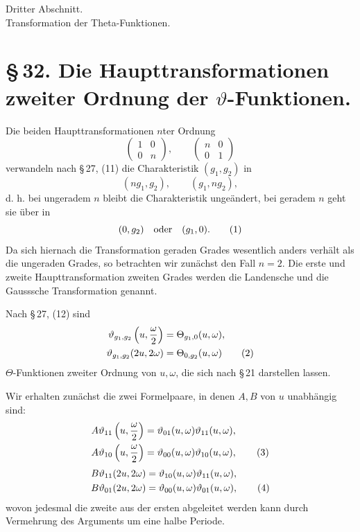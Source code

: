 \documentclass[11pt]{article}
\providecommand{\tht}{\vartheta}
\begin{document}
\begin{center}
{\large Dritter Abschnitt.}\\[0.7em]
{\Large Transformation der Theta-Funktionen.}
\end{center}

\section*{\S\,32. Die Haupttransformationen zweiter Ordnung der $\vartheta$-Funktionen.}

Die beiden Haupttransformationen $n$ter Ordnung
\[
\begin{pmatrix}1&0\\0&n\end{pmatrix},
\qquad
\begin{pmatrix}n&0\\0&1\end{pmatrix}
\]
verwandeln nach \S\,27, (11) die Charakteristik $(g_1,g_2)$ in
\[
(ng_1,g_2),\qquad (g_1,ng_2),
\]
d. h. bei ungeradem $n$ bleibt die Charakteristik ungeändert, bei geradem $n$ geht sie über in
\begin{equation}
(0,g_2)\quad\hbox{oder}\quad(g_1,0). \tag{1}
\end{equation}
Da sich hiernach die Transformation geraden Grades wesentlich anders verhält als die ungeraden Grades, so betrachten wir zunächst den Fall $n=2$. Die erste und zweite Haupttransformation zweiten Grades werden die Landensche und die Gausssche Transformation genannt.

Nach \S\,27, (12) sind
\begin{align}
\tht_{g_1,g_2}\left(u,{\omega\over2}\right)&=\Theta_{g_1,0}(u,\omega),\notag\\
\tht_{g_1,g_2}(2u,2\omega)&=\Theta_{0,g_2}(u,\omega) \tag{2}
\end{align}
$\Theta$-Funktionen zweiter Ordnung von $u,\omega$, die sich nach \S\,21 darstellen lassen.

Wir erhalten zunächst die zwei Formelpaare, in denen $A,B$ von $u$ unabhängig sind:
\begin{align}
A\tht_{11}\left(u,{\omega\over2}\right)&=\tht_{01}(u,\omega)\tht_{11}(u,\omega),\notag\\
A\tht_{10}\left(u,{\omega\over2}\right)&=\tht_{00}(u,\omega)\tht_{10}(u,\omega), \tag{3}
\end{align}
\begin{align}
B\tht_{11}(2u,2\omega)&=\tht_{10}(u,\omega)\tht_{11}(u,\omega),\notag\\
B\tht_{01}(2u,2\omega)&=\tht_{00}(u,\omega)\tht_{01}(u,\omega), \tag{4}
\end{align}
wovon jedesmal die zweite aus der ersten abgeleitet werden kann durch Vermehrung des Arguments um eine halbe Periode.
\end{document}
